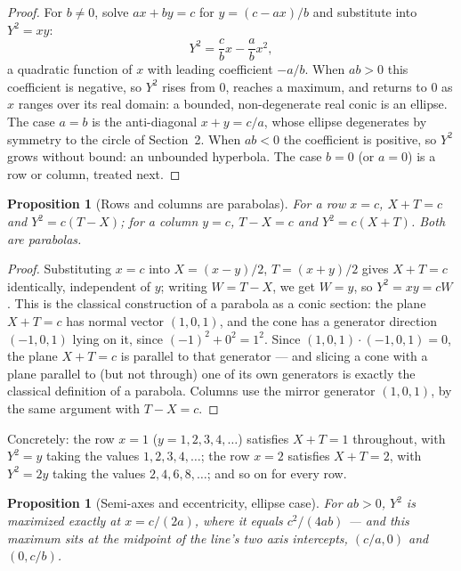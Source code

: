 \documentclass[11pt]{amsart}
\newtheorem{proposition}[theorem]{Proposition}
\theoremstyle{remark}
\begin{document}
\begin{proof}
For $b\ne0$, solve $ax+by=c$ for $y=(c-ax)/b$ and substitute into $Y^2=xy$:
\begin{equation}
Y^2=\frac cb x-\frac ab x^2, \tag{3.1}
\end{equation}
a quadratic function of $x$ with leading coefficient $-a/b$. When $ab>0$ this coefficient is negative, so $Y^2$ rises from $0$, reaches a maximum, and returns to $0$ as $x$ ranges over its real domain: a bounded, non-degenerate real conic is an ellipse. The case $a=b$ is the anti-diagonal $x+y=c/a$, whose ellipse degenerates by symmetry to the circle of Section~2. When $ab<0$ the coefficient is positive, so $Y^2$ grows without bound: an unbounded hyperbola. The case $b=0$ (or $a=0$) is a row or column, treated next.
\end{proof}

\begin{proposition}[Rows and columns are parabolas]
For a row $x=c$, $X+T=c$ and $Y^2=c(T-X)$; for a column $y=c$, $T-X=c$ and $Y^2=c(X+T)$. Both are parabolas.
\end{proposition}

\begin{proof}
Substituting $x=c$ into $X=(x-y)/2$, $T=(x+y)/2$ gives $X+T=c$ identically, independent of $y$; writing $W=T-X$, we get $W=y$, so $Y^2=xy=cW$. This is the classical construction of a parabola as a conic section: the plane $X+T=c$ has normal vector $(1,0,1)$, and the cone has a generator direction $(-1,0,1)$ lying on it, since $(-1)^2+0^2=1^2$. Since $(1,0,1)\cdot(-1,0,1)=0$, the plane $X+T=c$ is parallel to that generator --- and slicing a cone with a plane parallel to (but not through) one of its own generators is exactly the classical definition of a parabola. Columns use the mirror generator $(1,0,1)$, by the same argument with $T-X=c$.
\end{proof}

Concretely: the row $x=1$ ($y=1,2,3,4,\dots$) satisfies $X+T=1$ throughout, with $Y^2=y$ taking the values $1,2,3,4,\dots$; the row $x=2$ satisfies $X+T=2$, with $Y^2=2y$ taking the values $2,4,6,8,\dots$; and so on for every row.

\begin{proposition}[Semi-axes and eccentricity, ellipse case]
For $ab>0$, $Y^2$ is maximized exactly at $x=c/(2a)$, where it equals $c^2/(4ab)$ --- and this maximum sits at the midpoint of the line's two axis intercepts, $(c/a,0)$ and $(0,c/b)$.
\end{proposition}
\end{document}
